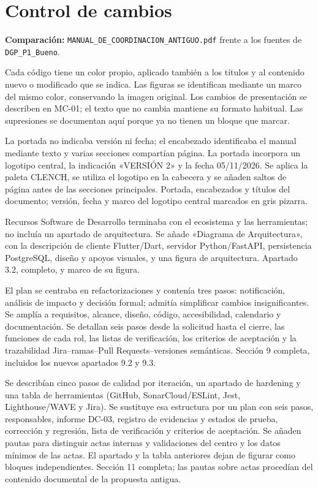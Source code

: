 \section*{Control de cambios}
{}
\noindent\textbf{Comparación:} \texttt{MANUAL\_DE\_COORDINACION\_ANTIGUO.pdf} frente a los fuentes de \texttt{DGP\_P1\_Bueno}.

Cada código tiene un color propio, aplicado también a los títulos y al contenido nuevo o modificado que se indica. Las figuras se identifican mediante un marco del mismo color, conservando la imagen original. Los cambios de presentación se describen en MC-01; el texto que no cambia mantiene su formato habitual. Las supresiones se documentan aquí porque ya no tienen un bloque que marcar.

{La portada no indicaba versión ni fecha; el encabezado identificaba el manual mediante texto y varias secciones compartían página.}
{La portada incorpora un logotipo central, la indicación «VERSIÓN 2» y la fecha 05/11/2026. Se aplica la paleta CLENCH, se utiliza el logotipo en la cabecera y se añaden saltos de página antes de las secciones principales.}
{Portada, encabezados y títulos del documento; versión, fecha y marco del logotipo central marcados en gris pizarra.}

{Recursos Software de Desarrollo terminaba con el ecosistema y las herramientas; no incluía un apartado de arquitectura.}
{Se añade «Diagrama de Arquitectura», con la descripción de cliente Flutter/Dart, servidor Python/FastAPI, persistencia PostgreSQL, diseño y apoyos visuales, y una figura de arquitectura.}
{Apartado 3.2, completo, y marco de su figura.}

{El plan se centraba en refactorizaciones y contenía tres pasos: notificación, análisis de impacto y decisión formal; admitía simplificar cambios insignificantes.}
{Se amplía a requisitos, alcance, diseño, código, accesibilidad, calendario y documentación. Se detallan seis pasos desde la solicitud hasta el cierre, las funciones de cada rol, las listas de verificación, los criterios de aceptación y la trazabilidad Jira--ramas--Pull Requests--versiones semánticas.}
{Sección 9 completa, incluidos los nuevos apartados 9.2 y 9.3.}

{Se describían cinco pasos de calidad por iteración, un apartado de hardening y una tabla de herramientas (GitHub, SonarCloud/ESLint, Jest, Lighthouse/WAVE y Jira).}
{Se sustituye esa estructura por un plan con seis pasos, responsables, informe DC-03, registro de evidencias y estados de prueba, corrección y regresión, lista de verificación y criterios de aceptación. Se añaden pautas para distinguir actas internas y validaciones del centro y los datos mínimos de las actas. El apartado y la tabla anteriores dejan de figurar como bloques independientes.}
{Sección 11 completa; las pautas sobre actas procedían del contenido documental de la propuesta antigua.}


